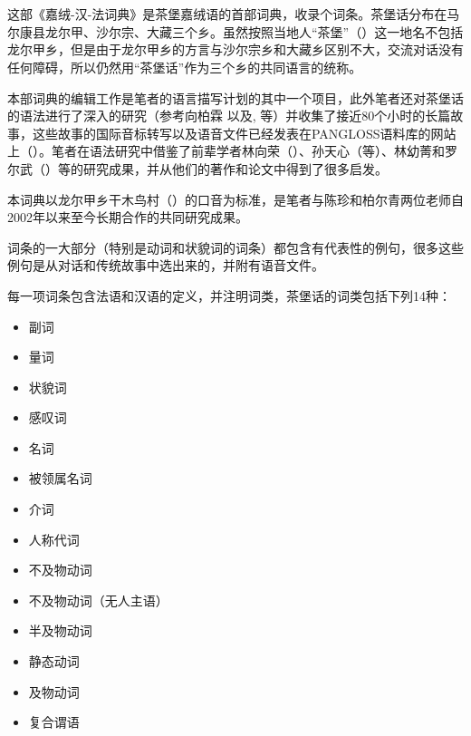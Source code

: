 
\cn
\section*{}

这部《嘉绒-汉-法词典》是茶堡嘉绒语的首部词典，收录个词条。茶堡话分布在马尔康县龙尔甲、沙尔宗、大藏三个乡。虽然按照当地人“茶堡”（）这一地名不包括龙尔甲乡，但是由于龙尔甲乡的方言与沙尔宗乡和大藏乡区别不大，交流对话没有任何障碍，所以仍然用“茶堡话”作为三个乡的共同语言的统称。

本部词典的编辑工作是笔者的语言描写计划的其中一个项目，此外笔者还对茶堡话的语法进行了深入的研究（参考向柏霖 \citeyear{jacques08}以及\citealt{jacques12incorp, jacques13tropative, jacques14antipassive,  jacques15spontaneous}, \citeyear{jacques15causative, jacques16relatives}等）并收集了接近80个小时的长篇故事，这些故事的国际音标转写以及语音文件已经发表在PANGLOSS语料库的网站上（\citealt{michailovsky14pangloss}）。笔者在语法研究中借鉴了前辈学者林向荣（\citeyear{linxr93jiarong}）、孙天心（\citeyear{jackson00sidaba, jackson04zhuangmaoci, jackson06paisheng, jackson14morpho}等）、林幼菁和罗尔武（\citeyear{linluo03}）等的研究成果，并从他们的著作和论文中得到了很多启发。


本词典以龙尔甲乡干木鸟村（）的口音为标准，是笔者与陈珍和柏尔青两位老师自2002年以来至今长期合作的共同研究成果。

词条的一大部分（特别是动词和状貌词的词条）都包含有代表性的例句，很多这些例句是从对话和传统故事中选出来的，并附有语音文件。

每一项词条包含法语和汉语的定义，并注明词类，茶堡话的词类包括下列14种：

\begin{itemize}
\item {} 副词
\item {} 量词
\item {} 状貌词
\item {} 感叹词
\item {} 名词
\item {} 被领属名词
\item {} 介词
\item {} 人称代词
\item {} 不及物动词
\item {} 不及物动词（无人主语）
\item {} 半及物动词
\item {} 静态动词
\item {} 及物动词
\item {} 复合谓语
\end{itemize}

